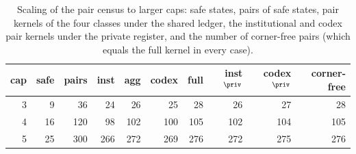 \begin{table}[H]
\centering\small
\caption{Scaling of the pair census to larger caps: safe states, pairs of safe states, pair kernels of the four classes under the shared ledger, the institutional and codex pair kernels under the private register, and the number of corner-free pairs (which equals the full kernel in every case).}
\label{tab:family}
\begin{tabular}{rrrrrrrrrr}
\toprule
cap & safe & pairs & inst & agg & codex & full & inst$^{\priv}$ & codex$^{\priv}$ & corner-free \\
\midrule
3 & 9 & 36 & 24 & 26 & 25 & 28 & 26 & 27 & 28 \\
4 & 16 & 120 & 98 & 102 & 100 & 105 & 102 & 104 & 105 \\
5 & 25 & 300 & 266 & 272 & 269 & 276 & 272 & 275 & 276 \\
\bottomrule
\end{tabular}
\end{table}
